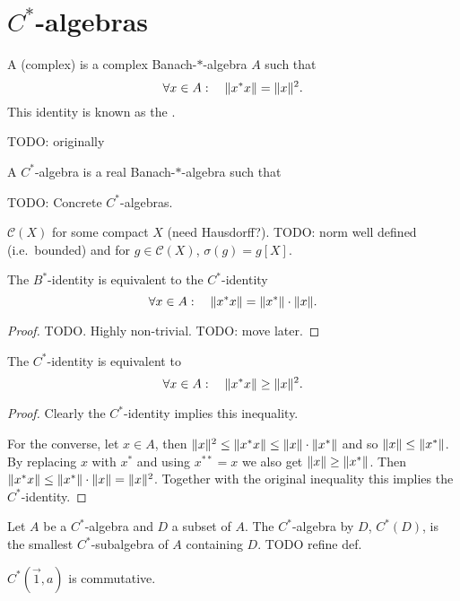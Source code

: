 \section{$C^*$-algebras}
\begin{definition}
A (complex)  is a complex Banach-$*$-algebra $A$ such that
\[\forall x\in A: \quad \lVert x^*x\rVert = \lVert x\rVert^2.\]
This identity is known as the .
\end{definition}
TODO: originally 

\begin{definition}
A  $C^*$-algebra is a real Banach-$*$-algebra such that 
\end{definition}

\begin{example}
TODO: Concrete $C^*$-algebras.

$\mathcal{C}(X)$ for some compact $X$ (need Hausdorff?). TODO: norm well defined (i.e.\ bounded) and for $g\in \mathcal{C}(X)$, $\sigma(g) = g[X]$.
\end{example}

\begin{proposition}
The $B^*$-identity is equivalent to the $C^*$-identity
\[\forall x\in A: \quad \lVert x^*x\rVert = \lVert x^*\rVert\cdot\lVert x\rVert.\]
\end{proposition}
\begin{proof}
TODO. Highly non-trivial. TODO: move later.
\end{proof}


\begin{lemma} \label{C*identityEquivalent}
The $C^*$-identity is equivalent to
\[\forall x\in A: \quad \lVert x^*x\rVert \geq \lVert x\rVert^2.\]
\end{lemma}
\begin{proof}
Clearly the $C^*$-identity implies this inequality.

For the converse, let $x\in A$, then $\lVert x\rVert^2 \leq \lVert x^*x\rVert \leq \lVert x\rVert\cdot\lVert x^*\rVert$ and so $\lVert x\rVert\leq \lVert x^*\rVert$. By replacing $x$ with $x^*$ and using $x^{**}=x$ we also get $\lVert x\rVert\geq \lVert x^*\rVert$. Then $\lVert x^*x\rVert\leq \lVert x^*\rVert\cdot\lVert x\rVert = \lVert x\rVert^2$. Together with the original inequality this implies the $C^*$-identity.
\end{proof}

\begin{definition}
Let $A$ be a $C^*$-algebra and $D$ a subset of $A$. The $C^*$-algebra  by $D$, $C^*(D)$, is the smallest $C^*$-subalgebra of $A$ containing $D$.
TODO refine def.
\end{definition}
\begin{lemma}
$C^*(\vec{1},a)$ is commutative.
\end{lemma}


